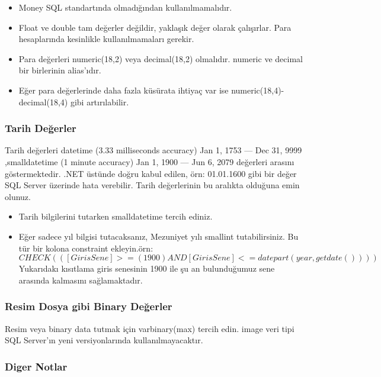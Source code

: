 \documentclass[10pt,a4paper,draft]{article}
\begin{document}
\begin{itemize}
\item  Money SQL standartında olmadığından kullanılmamalıdır. 
\item  Float ve double tam değerler değildir, yaklaşık değer olarak çalışırlar. 
Para hesaplarında kesinlikle kullanılmamaları gerekir.
\item Para değerleri numeric(18,2) veya decimal(18,2) olmalıdır. numeric ve decimal bir birlerinin alias'ıdır. 
\item Eğer para değerlerinde daha fazla küsürata ihtiyaç var ise   numeric(18,4)-decimal(18,4) gibi artırılabilir. 

\end{itemize} 
 			
\subsubsection{Tarih Değerler}
Tarih değerleri 	datetime (3.33 milliseconds accuracy)  	Jan 1, 1753  --- Dec 31, 9999
,smalldatetime (1 minute accuracy) 	Jan 1, 1900  --- Jun 6, 2079		
değerleri arasını göstermektedir. 
.NET üstünde doğru kabul edilen, 
örn: 01.01.1600 gibi bir değer SQL Server üzerinde hata verebilir.
Tarih değerlerinin bu aralıkta olduğuna emin olunuz.

\begin{itemize}

\item Tarih bilgilerini tutarken smalldatetime tercih ediniz. 			
\item Eğer sadece  yıl bilgisi tutacaksanız, Mezuniyet yılı smallint tutabilirsiniz. 
Bu tür bir kolona constraint ekleyin.örn: 
  $  CHECK  (([GirisSene]>=(1900) AND   [GirisSene]<=datepart(year,getdate()))) $
Yukarıdakı kısıtlama giris senesinin 1900 ile şu an bulunduğumuz sene arasında kalmasını sağlamaktadır.
\end{itemize}  			


\subsubsection{Resim Dosya gibi Binary Değerler}
Resim veya binary data tutmak için varbinary(max) tercih edin. image 
veri tipi SQL Server'ın yeni versiyonlarında kullanılmayacaktır.
 
\subsubsection{Diger Notlar}
\end{document}
